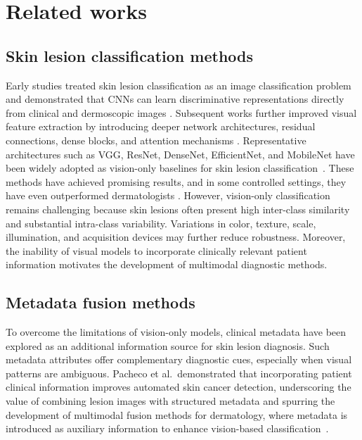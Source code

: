 \documentclass[preprint,12pt]{elsarticle}
\makeatletter
\def@NAT@last@yr{--\NAT@penalty}%
\makeatother
\begin{document}
\section{Related works}

\subsection{Skin lesion classification methods}
Early studies treated skin lesion classification as an image classification problem and demonstrated that CNNs can learn discriminative representations directly from clinical and dermoscopic images \cite{esteva2017dermatologist,codella2019skin}. Subsequent works further improved visual feature extraction by introducing deeper network architectures, residual connections, dense blocks, and attention mechanisms \cite{yu2017melanoma,hosny2022refined,wu2020skin}. Representative architectures such as VGG, ResNet, DenseNet, EfficientNet, and MobileNet have been widely adopted as vision-only baselines for skin lesion classification~\cite{simonyan2014very,he2016deep,huang2017densely,tan2019efficientnet,sandler2018mobilenetv2}. These methods have achieved promising results, and in some controlled settings, they have even outperformed dermatologists \cite{brinker2019deep}. However, vision-only classification remains challenging because skin lesions often present high inter-class similarity and substantial intra-class variability. Variations in color, texture, scale, illumination, and acquisition devices may further reduce robustness. Moreover, the inability of visual models to incorporate clinically relevant patient information motivates the development of multimodal diagnostic methods.




\subsection{Metadata fusion methods}
To overcome the limitations of vision-only models, clinical metadata have been explored as an additional information source for skin lesion diagnosis. Such metadata attributes offer complementary diagnostic cues, especially when visual patterns are ambiguous. Pacheco et al.~demonstrated that incorporating patient clinical information improves automated skin cancer detection, underscoring the value of combining lesion images with structured metadata and spurring the development of multimodal fusion methods for dermatology, where metadata is introduced as auxiliary information to enhance vision-based classification~\cite{pacheco2020impact}. 
\end{document}
